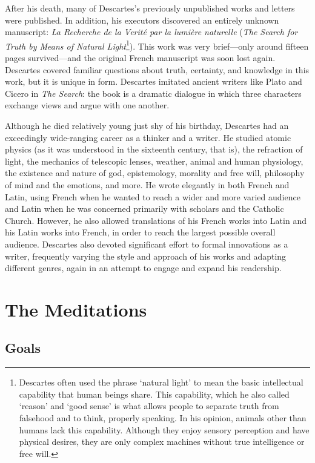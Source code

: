 After his death, many of Descartes's previously unpublished works and letters were published. In addition, his executors discovered an entirely unknown manuscript: \textit{La Recherche de la Verité par la lumière naturelle} (\textit{The Search for Truth by Means of Natural Light}\footnote{Descartes often used the phrase `natural light' to mean the basic intellectual capability that human beings share. This capability, which he also called `reason' and `good sense' is what allows people to separate truth from falsehood and to think, properly speaking. In his opinion, animals other than humans lack this capability. Although they enjoy sensory perception and have physical desires, they are only complex machines without true intelligence or free will.}). This work was very brief---only around fifteen pages survived---and the original French manuscript was soon lost again. Descartes covered familiar questions about truth, certainty, and knowledge in this work, but it is unique in form. Descartes imitated ancient writers like Plato and Cicero in \textit{The Search}: the book is a dramatic dialogue in which three characters exchange views and argue with one another.

Although he died relatively young just shy of his  birthday, Descartes had an exceedingly wide-ranging career as a thinker and a writer. He studied atomic physics (as it was understood in the sixteenth century, that is), the refraction of light, the mechanics of telescopic lenses, weather, animal and human physiology, the existence and nature of god, epistemology, morality and free will, philosophy of mind and the emotions, and more. He wrote elegantly in both French and Latin, using French when he wanted to reach a wider and more varied audience and Latin when he was concerned primarily with scholars and the Catholic Church. However, he also allowed translations of his French works into Latin and his Latin works into French, in order to reach the largest possible overall audience. Descartes also devoted significant effort to formal innovations as a writer, frequently varying the style and approach of his works and adapting different genres, again in an attempt to engage and expand his readership.

\section*{The Meditations}

\subsection*{Goals}


